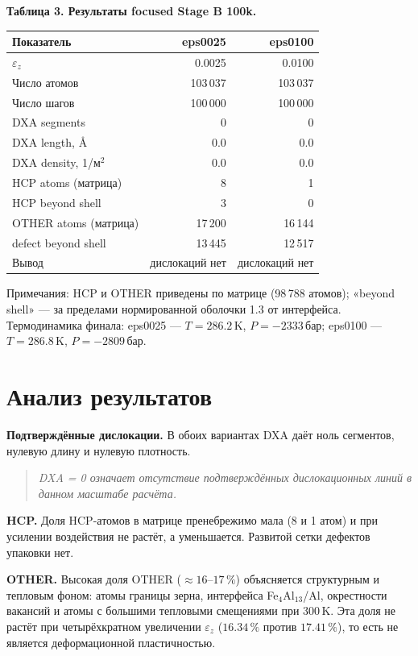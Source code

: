\documentclass[14pt,a4paper]{extarticle}
\newcommand{\tabcap}[1]{\par\smallskip\noindent\textbf{#1}\par\smallskip}
\begin{document}
\tabcap{Таблица 3. Результаты focused Stage B 100k.}
\begin{longtable}{p{} r r}
\toprule
Показатель & eps0025 & eps0100 \\
\midrule
\endhead
$\varepsilon_z$ & 0.0025 & 0.0100 \\
Число атомов & 103\,037 & 103\,037 \\
Число шагов & 100\,000 & 100\,000 \\
DXA segments & 0 & 0 \\
DXA length, \AA & 0.0 & 0.0 \\
DXA density, 1/м$^2$ & 0.0 & 0.0 \\
HCP atoms (матрица) & 8 & 1 \\
HCP beyond shell & 3 & 0 \\
OTHER atoms (матрица) & 17\,200 & 16\,144 \\
defect beyond shell & 13\,445 & 12\,517 \\
Вывод & дислокаций нет & дислокаций нет \\
\bottomrule
\end{longtable}

Примечания: HCP и OTHER приведены по матрице (98\,788 атомов); «beyond shell» — за пределами нормированной оболочки 1.3 от интерфейса. Термодинамика финала: eps0025 — $T = 286.2$\,K, $P = -2333$\,бар; eps0100 — $T = 286.8$\,K, $P = -2809$\,бар.

\section{Анализ результатов}
\textbf{Подтверждённые дислокации.} В обоих вариантах DXA даёт ноль сегментов, нулевую длину и нулевую плотность.

\begin{quote}
\itshape DXA = 0 означает отсутствие подтверждённых дислокационных линий в данном масштабе расчёта.
\end{quote}

\textbf{HCP.} Доля HCP-атомов в матрице пренебрежимо мала (8 и 1 атом) и при усилении воздействия не растёт, а уменьшается. Развитой сетки дефектов упаковки нет.

\textbf{OTHER.} Высокая доля OTHER ($\approx 16$–$17\,\%$) объясняется структурным и тепловым фоном: атомы границы зерна, интерфейса Fe$_4$Al$_{13}$/Al, окрестности вакансий и атомы с большими тепловыми смещениями при 300\,K. Эта доля не растёт при четырёхкратном увеличении $\varepsilon_z$ ($16.34\,\%$ против $17.41\,\%$), то есть не является деформационной пластичностью.
\end{document}
